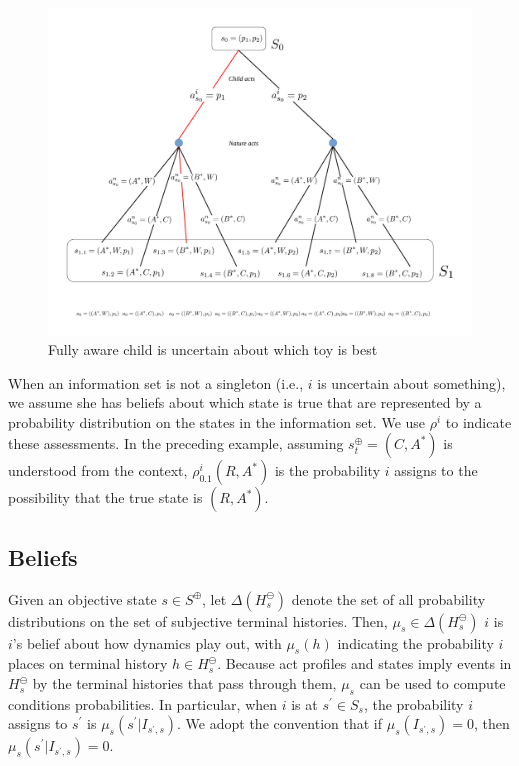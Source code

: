 \documentclass[
11pt,
titlepage,
reqno,
]{article}%
\theoremstyle{definition}
\begin{document}
\begin{figure}[h!]
	\centering
	\includegraphics*[page=3,trim = 0in 6in 6.5in 0in,scale=.8]{Awareness_Diagrams_All}
	\caption{Fully aware child is uncertain about which toy is best\label{Diag: p-03}}%
\end{figure}
	
When an information set is not a singleton (i.e., $i$ is uncertain about something), we assume she has beliefs about which state is true that are represented by a probability distribution on the states in the information set. 
We use $\rho^i$ to indicate these assessments. 
In the preceding example, assuming $s^\oplus_t=(C,A^\ast)$ is understood from the context, $\rho^i_{0.1}(R,A^\ast)$ is the probability $i$ assigns to the possibility that the true state is $(R,A^\ast)$.
	
\subsection{Beliefs} \label{sec: beliefs}
Given an objective state $s\in S^\oplus$, let $\Delta(H^\ominus_s)$ denote the set of all probability distributions on the set of subjective terminal histories. 
Then,  $\mu_s\in \Delta(H^\ominus_s)$ $i$ is $i$'s belief about how dynamics play out, with $\mu_s(h)$ indicating the probability $i$ places on terminal history $h\in H^\ominus_s$. 
Because act profiles and states imply events in $H^\ominus_s$ by the terminal histories that pass through them, $\mu_s$ can be used to compute conditions probabilities.
In particular, when $i$ is at $s^\prime\in S_s$, the probability $i$ assigns to $s^\prime$ is  $\mu_s(s^\prime|I_{s^\prime,s})$.
We adopt the convention that if  $\mu_s(I_{s^\prime,s})=0$, then  $\mu_s(s^\prime|I_{s^\prime,s})=0$.
\end{document}
